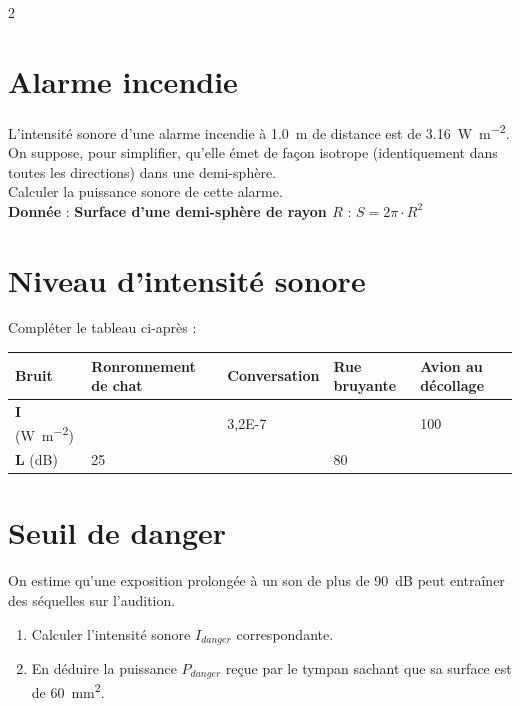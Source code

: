 \documentclass[a4paper,11pt,fleqn]{article}%
\begin{document}
\maketitle

\begin{multicols}{2}
\section{Alarme incendie}
L'intensité sonore d'une alarme incendie à \SI{1,0}{m} de distance est de \SI{3,16}{\watt\per\meter\squared}. On suppose, pour simplifier, qu'elle émet de façon isotrope (identiquement dans toutes les directions) dans une demi-sphère.\\
Calculer la puissance sonore de cette alarme.\\
\textbf{Donnée} : \textbf{Surface d'une demi-sphère de rayon $R$} : $S=2\pi \cdot R^2$

\section{Niveau d'intensité sonore}
Compléter le tableau ci-après :\\
\begin{tabular}{|>{\centering\footnotesize}m{.1\linewidth}|>{\centering\footnotesize}m{.2\linewidth}|>{\centering\footnotesize}m{.19\linewidth}|>{\centering\footnotesize}m{.125\linewidth}|>{\centering\footnotesize\arraybackslash}m{.16\linewidth}|}
    \hline
    \textbf{Bruit} & \textbf{Ronronnement de chat} & \textbf{Conversation} & \textbf{Rue bruyante} & \textbf{Avion au décollage}\\
    \hline
    \textbf{I} (\unit{\watt\per\meter\squared}) & & \num{3,2E-7}& & \num{100}\\
    \hline
    \textbf{L} (\unit{dB}) & \num{25} & & \num{80} & \\
    \hline
\end{tabular}

\section{Seuil de danger}
On estime qu'une exposition prolongée à un son de plus de \SI{90}{dB} peut entraîner des séquelles sur l'audition.
\begin{enumerate}
    \item Calculer l'intensité sonore $I_{danger}$ correspondante.
    \item En déduire la puissance $P_{danger}$ reçue par le tympan sachant que sa surface est de \SI{60}{\milli\meter\squared}.
\end{enumerate}


\end{multicols}
\end{document}
